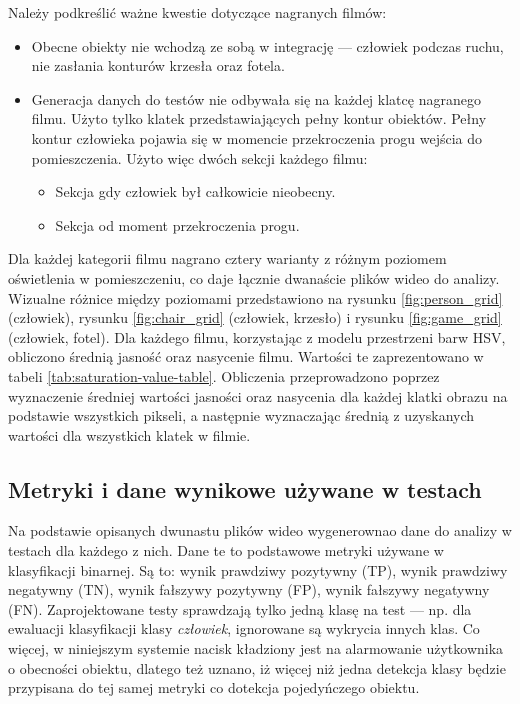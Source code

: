 Należy podkreślić ważne kwestie dotyczące nagranych filmów:
\begin{itemize}
    \item Obecne obiekty nie wchodzą ze sobą w integrację --- człowiek podczas ruchu, nie zasłania konturów krzesła oraz fotela.
    \item Generacja danych do testów nie odbywała się na każdej klatcę nagranego filmu. Użyto tylko klatek przedstawiających pełny kontur obiektów. Pełny kontur człowieka pojawia się w momencie przekroczenia progu wejścia do pomieszczenia. Użyto więc dwóch sekcji każdego filmu:
    \begin{itemize}
        \item Sekcja gdy człowiek był całkowicie nieobecny.
        \item Sekcja od moment przekroczenia progu.
    \end{itemize}
\end{itemize}

Dla każdej kategorii filmu nagrano cztery warianty z różnym poziomem oświetlenia w pomieszczeniu, co daje łącznie dwanaście plików wideo do analizy. Wizualne różnice między poziomami przedstawiono na rysunku \ref{fig:person_grid} (człowiek), rysunku \ref{fig:chair_grid} (człowiek, krzesło) i rysunku \ref{fig:game_grid} (człowiek, fotel). 
Dla każdego filmu, korzystając z modelu przestrzeni barw HSV, obliczono średnią jasność oraz nasycenie filmu. Wartości te zaprezentowano w tabeli \ref{tab:saturation-value-table}. Obliczenia przeprowadzono poprzez wyznaczenie średniej wartości jasności oraz nasycenia dla każdej klatki obrazu na podstawie wszystkich pikseli, a następnie wyznaczając średnią z uzyskanych wartości dla wszystkich klatek w filmie.











\subsection{Metryki i dane wynikowe używane w testach}
Na podstawie opisanych dwunastu plików wideo wygenerownao dane do analizy w testach dla każdego z nich. Dane te to podstawowe metryki używane w klasyfikacji binarnej. Są to: wynik prawdziwy pozytywny (TP), wynik prawdziwy negatywny (TN), wynik fałszywy pozytywny (FP), wynik fałszywy negatywny (FN). 
Zaprojektowane testy sprawdzają tylko jedną klasę na test --- np. dla ewaluacji klasyfikacji klasy \emph{człowiek}, ignorowane są wykrycia innych klas. Co więcej, w niniejszym systemie nacisk kładziony jest na alarmowanie użytkownika o obecności obiektu, dlatego też uznano, iż więcej niż jedna detekcja klasy będzie przypisana do tej samej metryki co dotekcja pojedyńczego obiektu. 

